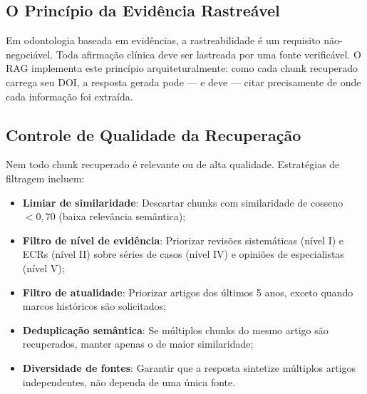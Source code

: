 \subsection{O Princípio da Evidência Rastreável}

Em odontologia baseada em evidências, a rastreabilidade é um requisito não-negociável. Toda afirmação clínica deve ser lastreada por uma fonte verificável. O RAG implementa este princípio arquiteturalmente: como cada chunk recuperado carrega seu DOI, a resposta gerada pode --- e deve --- citar precisamente de onde cada informação foi extraída.


\subsection{Controle de Qualidade da Recuperação}

Nem todo chunk recuperado é relevante ou de alta qualidade. Estratégias de filtragem incluem:
\begin{itemize}
    \item \textbf{Limiar de similaridade}: Descartar chunks com similaridade de cosseno $< 0,70$ (baixa relevância semântica);
    \item \textbf{Filtro de nível de evidência}: Priorizar revisões sistemáticas (nível I) e ECRs (nível II) sobre séries de casos (nível IV) e opiniões de especialistas (nível V);
    \item \textbf{Filtro de atualidade}: Priorizar artigos dos últimos 5 anos, exceto quando marcos históricos são solicitados;
    \item \textbf{Deduplicação semântica}: Se múltiplos chunks do mesmo artigo são recuperados, manter apenas o de maior similaridade;
    \item \textbf{Diversidade de fontes}: Garantir que a resposta sintetize múltiplos artigos independentes, não dependa de uma única fonte.
\end{itemize}

